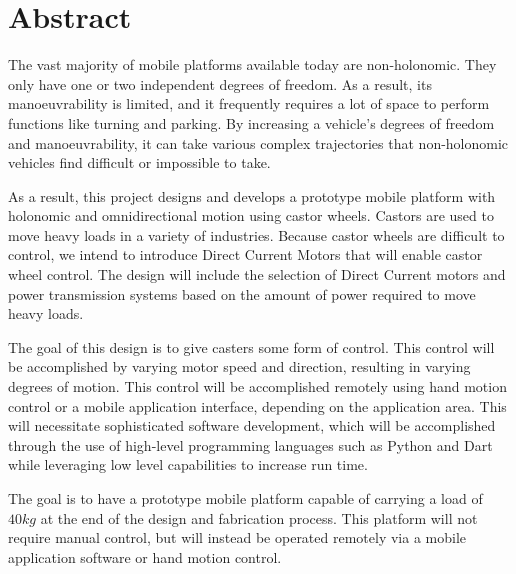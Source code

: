 \section*{Abstract}
\label{sec:}

The vast majority of mobile platforms available today are non-holonomic. They only have one or two independent degrees of freedom. As a result, its manoeuvrability is limited, and it frequently requires a lot of space to perform functions like turning and parking. By increasing a vehicle's degrees of freedom and manoeuvrability, it can take various complex trajectories that non-holonomic vehicles find difficult or impossible to take.
\par
As a result, this project designs and develops a prototype mobile platform with holonomic and omnidirectional motion using castor wheels. Castors are used to move heavy loads in a variety of industries. Because castor wheels are difficult to control, we intend to introduce Direct Current Motors that will enable castor wheel control. The design will include the selection of Direct Current motors and power transmission systems based on the amount of power required to move heavy loads.
\par
The goal of this design is to give casters some form of control. This control will be accomplished by varying motor speed and direction, resulting in varying degrees of motion. This control will be accomplished remotely using hand motion control or a mobile application interface, depending on the application area. This will necessitate sophisticated software development, which will be accomplished through the use of high-level programming languages such as Python and Dart while leveraging low level capabilities to increase run time. 
\par
The goal is to have a prototype mobile platform capable of carrying a load of $40kg$ at the end of the design and fabrication process. This platform will not require manual control, but will instead be operated remotely via a mobile application software or hand motion control.
